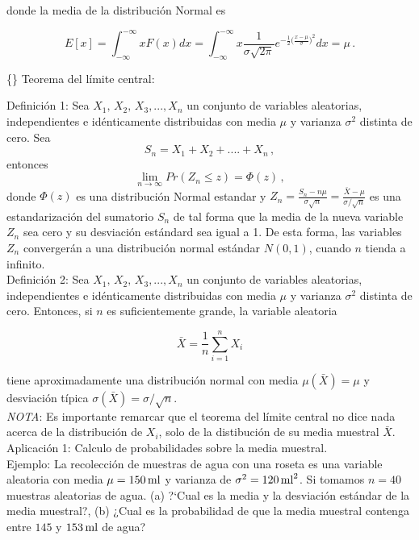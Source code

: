 \documentclass[
]{agujournal2019}
\begin{document}
donde la media de la distribución Normal es

\[E[x]=\int^{-\infty}_{-\infty} x F(x) dx=\int^{-\infty}_{-\infty} x \frac{1}{\sigma \sqrt{2\pi}}e^{-\frac{1}{2} \big( \frac{x-\mu}{\sigma} \big)^2 } dx=\mu\,.\]

\vspace{0.5cm}

\{\noindent\} Teorema del límite central:

Definición 1: Sea \(X_1,\,X_2,\,X_3,...,X_n\) un conjunto de variables
aleatorias, independientes e idénticamente distribuidas con media
\(\mu\) y varianza \(\sigma^2\) distinta de cero. Sea
\[S_n=X_1+X_2+....+X_n\,,\] entonces
\[\lim_{n \to\infty} Pr (Z_n\le z)= \Phi(z)\,,\] donde \(\Phi(z)\) es
una distribución Normal estandar y
\(Z_n=\frac{S_n - n\mu} {\sigma\sqrt{n}} = \frac{\bar{X} - \mu} {\sigma/\sqrt{n}}\)
es una estandarización del sumatorio \(S_n\) de tal forma que la media
de la nueva variable \(Z_n\) sea cero y su desviación estándard sea
igual a 1. De esta forma, las variables \(Z_n\) convergerán a una
distribución normal estándar \(N(0,1)\), cuando \(n\) tienda a
infinito.\\

Definición 2: Sea \(X_1,\,X_2,\,X_3,...,X_n\) un conjunto de variables
aleatorias, independientes e idénticamente distribuidas con media
\(\mu\) y varianza \(\sigma^2\) distinta de cero. Entonces, si \(n\) es
suficientemente grande, la variable aleatoria

\[\bar{X}=\frac{1}{n}\sum^n_{i=1}{X_i}\]

tiene aproximadamente una distribución normal con media
\(\mu(\bar{X})=\mu\) y desviación típica
\(\sigma(\bar{X})=\sigma/\sqrt{n}\).\\

\emph{NOTA}: Es importante remarcar que el teorema del límite central no
dice nada acerca de la distribución de \(X_i\), solo de la distibución
de su media muestral \(\bar{X}\).\\

Aplicación 1: Calculo de probabilidades sobre la media muestral.\\

Ejemplo: La recolección de muestras de agua con una roseta es una
variable aleatoria con media \(\mu=150\,{\rm ml}\) y varianza de
\(\sigma^2=120\,{\rm ml}^2\). Si tomamos \(n=40\) muestras aleatorias de
agua. (a) ?{}`Cual es la media y la desviación estándar de la media
muestral?, (b) ¿Cual es la probabilidad de que la media muestral
contenga entre \(145\) y \(153\,{\rm ml}\) de agua?\\
\end{document}
